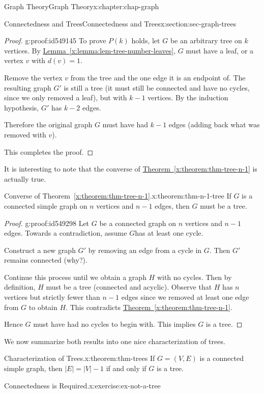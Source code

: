 \documentclass[oneside,10pt,]{book}
\newcommand{\xreffont}{\relax}
\numberwithin{equation}{section}
\begin{document}
\begin{chapterptx}{Graph Theory}{}{Graph Theory}{}{}{x:chapter:chap-graph}
\begin{sectionptx}{Connectedness and Trees}{}{Connectedness and Trees}{}{}{x:section:sec-graph-trees}
\begin{proof}{}{g:proof:id549145}
To prove \(P(k)\) holds, let \(G\) be an arbitrary tree on \(k\) vertices. By \hyperref[x:lemma:lem-tree-number-leaves]{Lemma~{\xreffont\ref{x:lemma:lem-tree-number-leaves}}}, \(G\) must have a leaf, or a vertex \(v\) with \(d(v) = 1\).%
\par
Remove the vertex \(v\) from the tree and the one edge it is an endpoint of. The resulting graph \(G'\) is still a tree (it must still be connected and have no cycles, since we only removed a leaf), but with \(k-1\) vertices. By the induction hypothesis, \(G'\) has \(k-2\) edges.%
\par
Therefore the original graph \(G\) must have had \(k-1\) edges (adding back what was removed with \(v\)).%
\par
This completes the proof.%
\end{proof}
It is interesting to note that the converse of \hyperref[x:theorem:thm-tree-n-1]{Theorem~{\xreffont\ref{x:theorem:thm-tree-n-1}}} is actually true.%
\begin{theorem}{Converse of Theorem~{\xreffont\ref*{x:theorem:thm-tree-n-1}}.}{}{x:theorem:thm-n-1-tree}%
If \(G\) is a connected simple graph on \(n\) vertices and \(n-1\) edges, then \(G\) must be a tree.%
\end{theorem}
\begin{proof}{}{g:proof:id549298}
Let \(G\) be a connected graph on \(n\) vertices and \(n-1\) edges. Towards a contradiction, assume \(G\)has at least one cycle.%
\par
Construct a new graph \(G'\) by removing an edge from a cycle in \(G\). Then \(G'\) remains connected (why?).%
\par
Continue this process until we obtain a graph \(H\) with no cycles. Then by definition, \(H\) must be a tree (connected and acyclic). Observe that \(H\) has \(n\) vertices but strictly fewer than \(n-1\) edges since we removed at least one edge from \(G\) to obtain \(H\). This contradicts \hyperref[x:theorem:thm-tree-n-1]{Theorem~{\xreffont\ref{x:theorem:thm-tree-n-1}}}.%
\par
Hence \(G\) must have had no cycles to begin with. This implies \(G\) is a tree.%
\end{proof}
We now summarize both results into one nice characterization of trees.%
\begin{theorem}{Characterization of Trees.}{}{x:theorem:thm-trees}%
If \(G = (V,E)\) is a connected simple graph, then \(|E| = |V| - 1\) if and only if \(G\) is a tree.%
\end{theorem}
\begin{inlineexercise}{Connectedness is Required.}{x:exercise:ex-not-a-tree}%

\end{inlineexercise}
\end{sectionptx}
\end{chapterptx}
\end{document}
